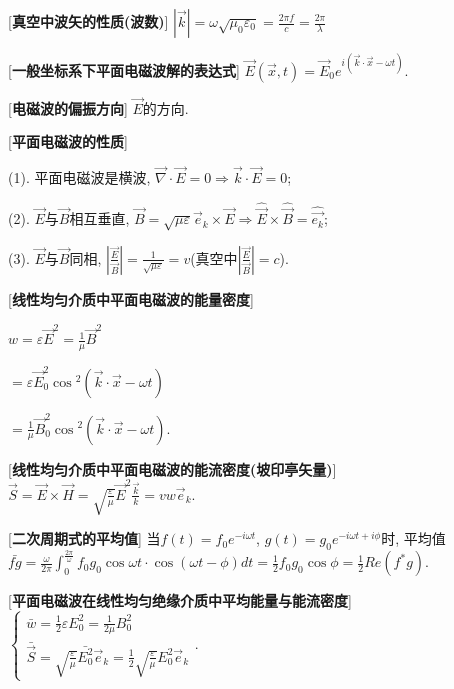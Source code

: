 [\textbf{真空中波矢的性质(波数)}] $|\vec k|=\omega\sqrt{\mu_0\varepsilon_0}=\frac{2\pi f}{c}=\frac{2\pi}{\lambda}$

[\textbf{一般坐标系下平面电磁波解的表达式}] $\vec E(\vec x, t)=\vec E_0e^{i(\vec k\cdot\vec x-\omega t)}$.\par

[\textbf{电磁波的偏振方向}] $\vec E$的方向.\par

[\textbf{平面电磁波的性质}]\par
\qquad (1). 平面电磁波是横波, $\vec\nabla\cdot\vec E=0\Rightarrow \vec k\cdot\vec E=0$;\par
\qquad (2). $\vec E$与$\vec B$相互垂直, $\vec B=\sqrt{\mu\varepsilon}\vec e_k\times\vec E\Rightarrow \hat{\vec E}\times\hat{\vec B}=\hat{\vec{e_k}}$;\par
\qquad (3). $\vec E$与$\vec B$同相, $\left|\frac{\vec E}{\vec B}\right|=\frac{1}{\sqrt{\mu\varepsilon}}=v$(真空中$\left|\frac{\vec E}{\vec B}\right|=c$).\par

[\textbf{线性均匀介质中平面电磁波的能量密度}] \par
\qquad $w=\varepsilon \vec E^2=\frac{1}{\mu}\vec B^2$\par
\qquad \quad $=\varepsilon \vec E_0^2\cos{^2(\vec k\cdot\vec x-\omega t)}$\par
\qquad \quad $=\frac{1}{\mu}\vec B_0^2\cos{^2(\vec k\cdot\vec x-\omega t)}$.\par

[\textbf{线性均匀介质中平面电磁波的能流密度(坡印亭矢量)}] $\vec S=\vec E\times\vec H=\sqrt{\frac{\varepsilon}{\mu}}\vec E^2\frac{\vec k}{k}=vw\vec e_k$.\par

[\textbf{二次周期式的平均值}] 当$f(t)=f_0e^{-i\omega t}$, $g(t)=g_0e^{-i\omega t+i\phi}$时, 平均值\\$\bar{fg}=\frac{\omega}{2\pi}\int_0^{\frac{2\pi}{\omega}}f_0g_0\cos{\omega t}\cdot\cos{(\omega t-\phi)}dt=\frac{1}{2}f_0g_0\cos\phi=\frac{1}{2}Re(f^*g)$.\par

\clearpage

[\textbf{平面电磁波在线性均匀绝缘介质中平均能量与能流密度}] $\begin{cases}\bar w=\frac{1}{2}\varepsilon E_0^2=\frac{1}{2\mu}B_0^2\\ \bar{\vec S}=\sqrt{\frac{\varepsilon}{\mu}}\bar{E_0^2}\vec e_k=\frac{1}{2}\sqrt{\frac{\varepsilon}{\mu}}E_0^2\vec e_k\end{cases}$.\par

